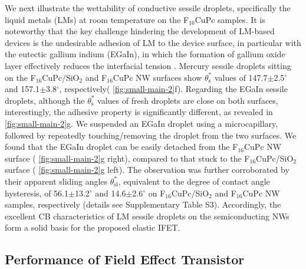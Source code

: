 We next illustrate the wettability of conductive sessile droplets,
specifically the liquid metals (LMs) at room temperature on the
F\(_{\text{16}}\)CuPc samples. It is noteworthy that the key challenge hindering
the development of LM-based devices is the undesirable adhesion of LM
to the device surface, in particular with the eutectic gallium indium
(EGaIn), in which the formation of gallium oxide layer effectively
reduces the interfacial tension
\cite{Dickey_2008_EGAIN,Doudrick_2014_oxide}. Mercury sessile droplets
sitting on the F\(_{\text{16}}\)CuPc/SiO\(_{\text{2}}\) and F\(_{\text{16}}\)CuPc NW surfaces show
\(\theta_{\mathrm{s}}^{*}\) values of 147.7\(\pm\)2.5\(^{\circ}\) and
157.1\(\pm\)3.8\(^{\circ}\), respectively( \autoref{fig:small-main-2}f).
Regarding the EGaIn sessile droplets, although the
\(\theta_{\mathrm{s}}^{*}\) values of fresh droplets are close on both
surfaces, interestingly, the adhesive property is significantly
different, as revealed in  \autoref{fig:small-main-2}g. We suspended an
EGaIn droplet using a microcapillary, followed by repeatedly
touching/removing the droplet from the two surfaces. We found that
the EGaIn droplet can be easily detached from the F\(_{\text{16}}\)CuPc NW
surface ( \autoref{fig:small-main-2}g right), compared to that stuck to the
F\(_{\text{16}}\)CuPc/SiO\(_{\text{2}}\) surface ( \autoref{fig:small-main-2}g left). The observation was further corroborated
by their apparent sliding angles \(\theta_{\mathrm{sl}}^{*}\),
equivalent to the degree of contact angle hysteresis, of
56.1\(\pm\)13.2\(^{\circ}\) and 14.6\(\pm\)2.6\(^{\circ}\) on
F\(_{\text{16}}\)CuPc/SiO\(_{\text{2}}\) and F\(_{\text{16}}\)CuPc NW samples, respectively (details
see Supplementary Table S3). Accordingly, the excellent CB
characteristics of LM sessile droplets on the semiconducting NWs form
a solid basis for the proposed elastic IFET.

\subsection{Performance of Field Effect Transistor }
\label{sec:small-field-effect-trans}


